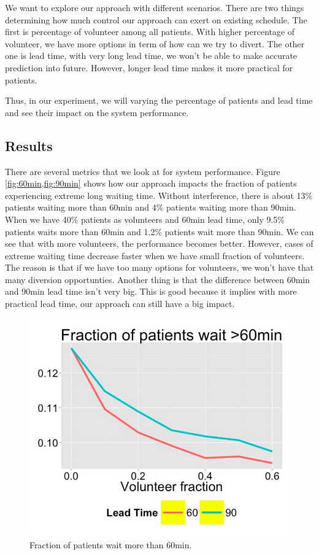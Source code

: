 We want to explore our approach with different scenarios. There are two things
determining how much control our approach can exert on existing schedule.
The first is percentage of volunteer among all patients. With higher percentage
of volunteer, we have more options in term of how can we try to divert.
The other one is lead time, with very long lead time, we won't be able to
make accurate prediction into future. However, longer lead time makes it
more practical for patients.

Thus, in our experiment, we will varying the percentage of patients and
lead time and see their impact on the system performance.

\subsection{Results}

There are several metrics that we look at for system performance.
Figure \ref{fig:60min,fig:90min} shows how
our approach impacts the fraction of patients experiencing extreme long
waiting time. Without interference, there is about 13\% patients waiting
more than 60min and 4\% patients waiting more than 90min. When we
have 40\% patients as volunteers and 60min lead time, only 9.5\% patients
waits more than 60min and 1.2\% patients wait more than 90min.
We can see that with more volunteers, the performance becomes better.
However, cases of extreme waiting time decrease faster when we have
small fraction of volunteers. The reason is that if we have too many
options for volunteers, we won't have that many diversion opportunties.
Another thing is that the difference between 60min and 90min lead time
isn't very big. This is good because it implies with more practical
lead time, our approach can still have a big impact.

\begin{figure}
\centering
\includegraphics[width=.9\textwidth]{chap3/pic/60min_wait.pdf}
\caption{Fraction of patients wait more than 60min.}
\label{fig:60min}
\end{figure}

